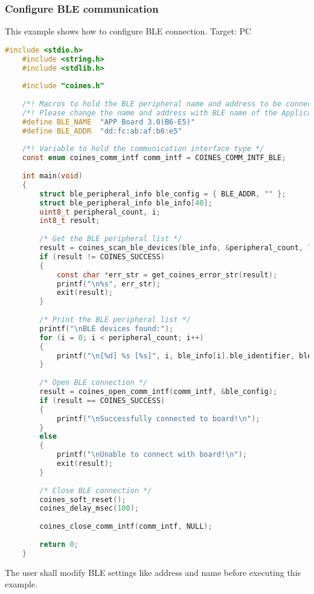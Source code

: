 \documentclass{article}
\begin{document}
\subsubsection{Configure BLE communication}\label{bleComConfig}
This example shows how to configure BLE connection.
\newline Target: PC
\begin{lstlisting}[language=c]
	#include <stdio.h>
	#include <string.h>
	#include <stdlib.h>
	
	#include "coines.h"
	
	/*! Macros to hold the BLE peripheral name and address to be connected */
	/*! Please change the name and address with BLE name of the Application board under test */
	#define BLE_NAME  "APP Board 3.0(B6-E5)"
	#define BLE_ADDR  "dd:fc:ab:af:b6:e5"
	
	/*! Variable to hold the communication interface type */
	const enum coines_comm_intf comm_intf = COINES_COMM_INTF_BLE;
	
	int main(void)
	{
		struct ble_peripheral_info ble_config = { BLE_ADDR, "" };
		struct ble_peripheral_info ble_info[40];
		uint8_t peripheral_count, i;
		int8_t result;
	
		/* Get the BLE peripheral list */
		result = coines_scan_ble_devices(ble_info, &peripheral_count, 7000);
		if (result != COINES_SUCCESS)
		{
			const char *err_str = get_coines_error_str(result);
			printf("\n%s", err_str);
			exit(result);
		}
	
		/* Print the BLE peripheral list */
		printf("\nBLE devices found:");
		for (i = 0; i < peripheral_count; i++)
		{
			printf("\n[%d] %s [%s]", i, ble_info[i].ble_identifier, ble_info[i].ble_address);
		}
	
		/* Open BLE connection */
		result = coines_open_comm_intf(comm_intf, &ble_config);
		if (result == COINES_SUCCESS)
		{
			printf("\nSuccessfully connected to board!\n");
		}
		else
		{
			printf("\nUnable to connect with board!\n");
			exit(result);
		}
	
		/* Close BLE connection */
		coines_soft_reset();
		coines_delay_msec(100);
	
		coines_close_comm_intf(comm_intf, NULL);
	
		return 0;
	}	

\end{lstlisting}
The user shall modify BLE settings like address and name before executing this example.
\end{document}
